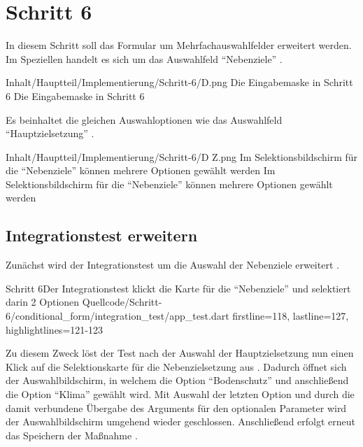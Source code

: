 \chapter{Schritt 6}
\label{chap:Schritt-6}

In diesem Schritt soll das Formular um Mehrfachauswahlfelder erweitert werden.
Im Speziellen handelt es sich um das Auswahlfeld \enquote{Nebenziele} \Abb{\ref{fig:Schritt4EingabemaskeD}}.
\begin{alexfigure}{Inhalt/Hauptteil/Implementierung/Schritt-6/D.png}
  {Die Eingabemaske in Schritt 6}
  {Die Eingabemaske in Schritt 6}

  \label{fig:Schritt4EingabemaskeD}

\end{alexfigure}


Es beinhaltet die gleichen Auswahloptionen wie das Auswahlfeld \enquote{Hauptzielsetzung} \Abb{\ref{fig:Schritt4EingabemaskeDZ}}.
\begin{alexfigure}{Inhalt/Hauptteil/Implementierung/Schritt-6/D Z.png}
  {Im Selektionsbildschirm für die \enquote{Nebenziele} können mehrere Optionen gewählt werden}
  {Im Selektionsbildschirm für die \enquote{Nebenziele} können mehrere Optionen gewählt werden}

  \label{fig:Schritt4EingabemaskeDZ}

\end{alexfigure}


\section{Integrationstest erweitern}

Zunächst wird der Integrationstest um die Auswahl der Nebenziele erweitert \Lst{\ref{lst:Schritt6tabSelectionCard}}.

\begin{alexlisting}{Schritt 6}{Der Integrationstest klickt die Karte für die \enquote{Nebenziele} und selektiert darin 2 Optionen}
  {Quellcode/Schritt-6/conditional_form/integration_test/app_test.dart}
  {firstline=118, lastline=127, highlightlines={121-123}}
  \label{lst:Schritt6tabSelectionCard}
\end{alexlisting}

Zu diesem Zweck löst der Test nach der Auswahl der Hauptzielsetzung  nun einen Klick auf die Selektionskarte für die Nebenzielsetzung aus .
Dadurch öffnet sich der Auswahlbildschirm,
in welchem die Option \enquote{Bodenschutz}  und anschließend die Option \enquote{Klima}  gewählt wird.
Mit Auswahl der letzten Option
und durch die damit verbundene Übergabe des Arguments  für den optionalen Parameter  wird der Auswahlbildschirm umgehend wieder geschlossen.
Anschließend erfolgt erneut das Speichern der Maßnahme .



